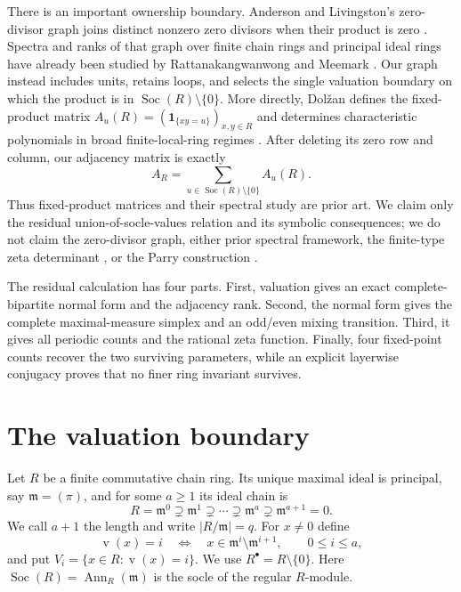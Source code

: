 \documentclass[11pt,a4paper]{amsart}
\theoremstyle{definition}
\theoremstyle{remark}
\newcommand{\Soc}{\operatorname{Soc}}
\newcommand{\val}{\operatorname{v}}
\begin{document}
There is an important ownership boundary.  Anderson and Livingston's
zero-divisor graph joins distinct nonzero zero divisors when their product is
zero \cite{AndersonLivingston1999}.  Spectra and ranks of that graph over
finite chain rings and principal ideal rings have already been studied by
Rattanakangwanwong and Meemark \cite{RattanakangwanwongMeemark2022}.  Our
graph instead includes units, retains loops, and selects the single valuation
boundary on which the product is in $\Soc(R)\setminus\{0\}$.  More directly,
Dol\v{z}an defines the fixed-product matrix
$A_u(R)=(\mathbf 1_{\{xy=u\}})_{x,y\in R}$ and determines characteristic
polynomials in broad finite-local-ring regimes \cite{Dolzan2026}.  After
deleting its zero row and column, our adjacency matrix is exactly
\[
 A_R=\sum_{u\in\Soc(R)\setminus\{0\}}A_u(R).
\]
Thus fixed-product matrices and their spectral study are prior art.  We claim
only the residual union-of-socle-values relation and its symbolic consequences;
we do not claim the zero-divisor graph, either prior spectral framework, the
finite-type zeta determinant \cite{BowenLanford1970}, or the Parry construction
\cite{Parry1964}.

The residual calculation has four parts.  First, valuation gives an exact
complete-bipartite normal form and the adjacency rank.  Second, the normal
form gives the complete maximal-measure simplex and an odd/even mixing
transition.  Third, it gives all periodic counts and the rational zeta
function.  Finally, four fixed-point counts recover the two surviving
parameters, while an explicit layerwise conjugacy proves that no finer ring
invariant survives.

\section{The valuation boundary}
\label{sec:valuation}

Let $R$ be a finite commutative chain ring.  Its unique maximal ideal is
principal, say $\mathfrak m=(\pi)$, and for some $a\geq1$ its ideal chain is
\[
 R=\mathfrak m^0\supsetneq\mathfrak m^1\supsetneq\cdots
 \supsetneq\mathfrak m^a\supsetneq\mathfrak m^{a+1}=0.
\]
We call $a+1$ the length and write $|R/\mathfrak m|=q$.  For $x\ne0$ define
\[
 \val(x)=i\quad\Longleftrightarrow\quad
 x\in\mathfrak m^i\setminus\mathfrak m^{i+1},
 \qquad 0\leq i\leq a,
\]
and put $V_i=\{x\in R:\val(x)=i\}$.  We use $R^\bullet=R\setminus\{0\}$.
Here $\Soc(R)=\operatorname{Ann}_R(\mathfrak m)$ is the socle of the regular
$R$-module.
\end{document}

